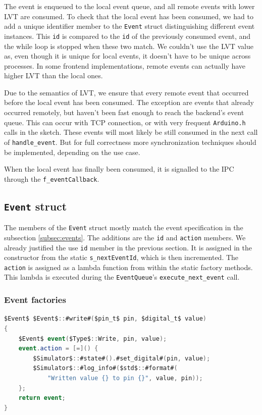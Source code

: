 The event is enqueued to the local event queue, and all remote events with lower LVT are consumed. To check that the local event has been consumed, we had to add a unique identifier member to the \texttt{Event} struct distinguishing different event instances. This \texttt{id} is compared to the \texttt{id} of the previously consumed event, and the while loop is stopped when these two match. We couldn't use the LVT value as, even though it is unique for local events, it doesn't have to be unique across processes. In some frontend implementations, remote events can actually have higher LVT than the local ones.

Due to the semantics of LVT, we ensure that every remote event that occurred before the local event has been consumed. The exception are events that already occurred remotely, but haven't been fast enough to reach the backend's event queue. This can occur with TCP connection, or with very frequent \texttt{Arduino.h} calls in the sketch. These events will most likely be still consumed in the next call of \texttt{handle\_event}. But for full correctness more synchronization techniques should be implemented, depending on the use case.

When the local event has finally been consumed, it is signalled to the IPC through the \texttt{f\_eventCallback}.

\subsection{\texttt{Event} struct}

The members of the \texttt{Event} struct mostly match the event specification in the subsection \ref{subsec:events}. The additions are the \texttt{id} and \texttt{action} members. We already justified the use \texttt{id} member in the previous section. It is assigned in the constructor from the static \texttt{s\_nextEventId}, which is then incremented. The \texttt{action} is assigned as a lambda function from within the static factory methods. This lambda is executed during the \texttt{EventQueue}'s \texttt{execute\_next\_event} call.

\subsubsection{Event factories}

\begin{lstlisting}[language=csharp, caption={\texttt{Event::write} function}]
$Event$ $Event$::#write#($pin_t$ pin, $digital_t$ value)
{
    $Event$ event($Type$::Write, pin, value);
    event.action = [=]() {
        $Simulator$::#state#().#set_digital#(pin, value);
        $Simulator$::#log_info#($std$::#format#(
            "Written value {} to pin {}", value, pin));
    };
    return event;
}
\end{lstlisting}

